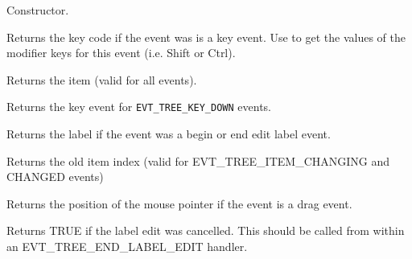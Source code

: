 


Constructor.



Returns the key code if the event was is a key event. Use 
 to get the values of the
modifier keys for this event (i.e. Shift or Ctrl).



Returns the item (valid for all events).

\label{wxtreeeventgetkeyevent}


Returns the key event for {\tt EVT\_TREE\_KEY\_DOWN} events.



Returns the label if the event was a begin or end edit label event.



Returns the old item index (valid for EVT\_TREE\_ITEM\_CHANGING and CHANGED events)



Returns the position of the mouse pointer if the event is a drag event.



Returns TRUE if the label edit was cancelled. This should be
called from within an EVT\_TREE\_END\_LABEL\_EDIT handler.


